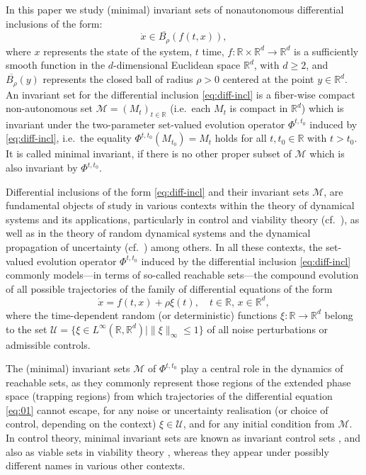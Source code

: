 \documentclass[reqno]{amsart}
\theoremstyle{definition}
\numberwithin{equation}{section}
\newcommand{\R}{\mathbb{R}}
\newcommand{\M}{\mathscr{M}}
\newcommand{\U}{\mathcal{U}}
\begin{document}
In this paper we study (minimal) invariant sets of nonautonomous differential inclusions of the form:
\begin{equation}
    \label{eq:diff-incl}
    \dot{x}\in \overline{B_{\rho}}(f(t,x)),
\end{equation}
where $x$ represents the state of the system, $t$ time, $f:\mathbb{R}\times \mathbb{R}^d\rightarrow \mathbb{R}^d$ is a sufficiently smooth function in the $d$-dimensional Euclidean space $\mathbb{R}^d$, with $d\geq 2$, and $\overline{B_{\rho}}(y)$ represents the closed ball of radius $\rho >0$ centered at the point $y\in \mathbb{R}^d$. 
An invariant set for the differential inclusion \eqref{eq:diff-incl} is a fiber-wise compact non-autonomous set $\M=(M_t)_{t\in \mathbb{R}}$ (i.e.~each $M_t$ is compact in $\mathbb{R}^d$) which is invariant under the two-parameter set-valued evolution operator $\Phi^{t,t_0}$ induced by \eqref{eq:diff-incl}, i.e.~the equality $\Phi^{t,t_0}(M_{t_0})=M_t$ holds for all $t,t_0\in \mathbb{R}$ with $t> t_0$. It is called minimal invariant, if there is no other proper subset of $\M$ which is also invariant by $\Phi^{t,t_0}$.


Differential inclusions of the form \eqref{eq:diff-incl} and their invariant sets $\M$, are fundamental objects of study in various contexts within the theory of dynamical systems and its applications, particularly in control and viability theory (cf.~\cite{aubin1984differential, colonius2012dynamics,lee1986foundations,pontryagin1962optimal}), as well as in the theory of random dynamical systems and the dynamical propagation of uncertainty (cf.~\cite{arnold1998rds,banks2014uncertainty,catuogno2025minimal,chappelle2023rate,cui2017uniform,li2024pullback}) among others. In all these contexts, the set-valued evolution operator $\Phi^{t,t_0}$ induced by the differential inclusion \eqref{eq:diff-incl} commonly models---in terms of so-called reachable sets---the compound evolution of all possible trajectories of the family of differential equations of the form
\begin{equation}
\label{eq:01}
    \dot x = f(t,x) + \rho\xi(t),\quad t\in\R,\, x\in\R^d,
\end{equation}
where the time-dependent random (or deterministic) functions $\xi:\R\to\R^d$  belong to the set $\U=\{\xi\in L^\infty(\R,\R^d)\mid \|\xi\|_\infty\le1\}$ of all noise perturbations or admissible controls.

The (minimal) invariant sets $\M$ of  $\Phi^{t,t_0}$ play a central role in the dynamics of reachable sets, as they commonly represent those regions of the extended phase space (trapping regions) from which trajectories of the differential equation \eqref{eq:01} cannot escape, for any noise or uncertainty realisation (or choice of control, depending on the context) $\xi\in\mathcal{U}$, and for any initial condition from $\M$. In control theory, minimal invariant sets are known as invariant control sets \cite{colonius2012dynamics}, and also as viable sets in viability theory \cite{aubin1984differential}, whereas they appear under possibly different names in various other contexts. 
\end{document}
